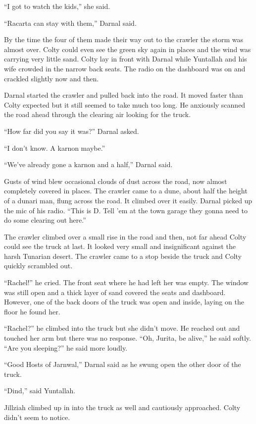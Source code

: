 ``I got to watch the kids,'' she said.

``Racarta can stay with them,'' Darnal said.

By the time the four of them made their way out to the crawler the storm was almost over. Colty
could even see the green sky again in places and the wind was carrying very little sand. Colty
lay in front with Darnal while Yuntallah and his wife crowded in the narrow back seats. The
radio on the dashboard was on and crackled slightly now and then.

Darnal started the crawler and pulled back into the road. It moved faster than Colty expected
but it still seemed to take much too long. He anxiously scanned the road ahead through the
clearing air looking for the truck.

``How far did you say it was?'' Darnal asked.

``I don't know. A karnon maybe.''

``We've already gone a karnon and a half,'' Darnal said.

Gusts of wind blew occasional clouds of dust across the road, now almost completely covered in
places. The crawler came to a dune, about half the height of a dunari man, flung across the
road. It climbed over it easily. Darnal picked up the mic of his radio. ``This is D. Tell 'em at
the town garage they gonna need to do some clearing out here.''

The crawler climbed over a small rise in the road and then, not far ahead Colty could see the
truck at last. It looked very small and insignificant against the harsh Tunarian desert. The
crawler came to a stop beside the truck and Colty quickly scrambled out.

``Rachel!'' he cried. The front seat where he had left her was empty. The window was still open
and a thick layer of sand covered the seats and dashboard. However, one of the back doors of the
truck was open and inside, laying on the floor he found her.

``Rachel?'' he climbed into the truck but she didn't move. He reached out and touched her arm
but there was no response. ``Oh, Jurita, be alive,'' he said softly. ``Are you sleeping?'' he
said more loudly.

``Good Hosts of Jarnwal,'' Darnal said as he swung open the other door of the truck.

``Dind,'' said Yuntallah.

Jillziah climbed up in into the truck as well and cautiously approached. Colty didn't seem to
notice.

